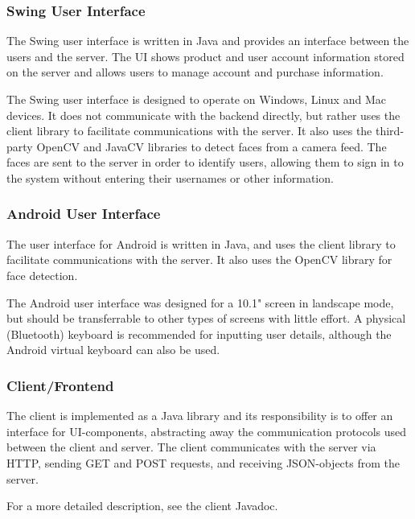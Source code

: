 \documentclass[11pt]{article}
\begin{document}
\subsubsection*{Swing User Interface}
     
The Swing user interface is written in Java and provides an interface
between the users and the server. The UI shows product and user account
information stored on the server and allows users to manage account
and purchase information.

The Swing user interface is designed to operate on Windows, Linux and
Mac devices. It does not communicate with the backend directly, but rather
uses the client library to facilitate communications with the server.
It also uses the third-party OpenCV and JavaCV libraries to detect faces
from a camera feed. The faces are sent to the server in order to identify
users, allowing them to sign in to the system without entering their
usernames or other information.

\subsubsection*{Android User Interface}

The user interface for Android is written in Java, and uses the client
library to facilitate communications with the server. It also uses the OpenCV library for face detection.

The Android user interface was designed for a 10.1" screen in landscape mode, but should be transferrable to other types of screens with little effort. A physical (Bluetooth) keyboard is recommended for inputting user details, although the Android virtual keyboard can also be used.

\subsubsection*{Client/Frontend}
The client is implemented as a Java library and its responsibility is
to offer an interface for UI-components, abstracting away the
communication protocols used between the client and server. The client 
communicates with the server via HTTP, sending GET and POST requests, 
and receiving JSON-objects from the server. 

For a more detailed description, see the client Javadoc.
\end{document}
